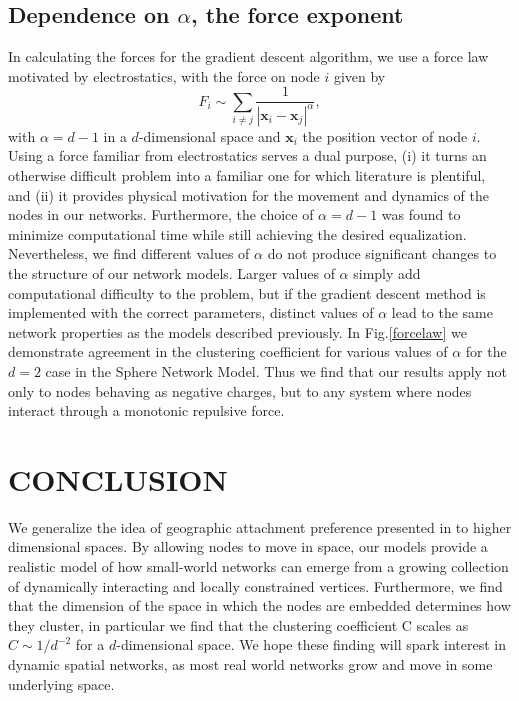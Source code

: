 \documentclass[aps,pre,manuscript,superscriptaddress,amsmath,amssymb,nofootinbib]{revtex4-1}
\begin{document}
\subsection{Dependence on $\alpha$, the force exponent}
\label{sub:forcelaw}
In calculating the forces for the gradient descent algorithm, we use a force law motivated by electrostatics, with the force on node $i$ given by 
\begin{equation}
F_i \sim \sum_{i \neq j} \frac{1}{|\textbf{x}_i - \textbf{x}_j|^{\alpha}}, 
\end{equation}
with $\alpha = d-1$ in a $d$-dimensional space and $\textbf{x}_i$ the position vector of node $i$.
Using a force familiar from electrostatics serves a dual purpose, (i) it turns an otherwise difficult problem into a familiar one for which literature is plentiful, and (ii) it provides physical motivation for the movement and dynamics of the nodes in our networks.
Furthermore, the choice of $\alpha = d-1$ was found to minimize computational time while still achieving the desired equalization.
Nevertheless, we find different values of $\alpha$ do not produce significant changes to the structure of our network models.
Larger values of $\alpha$ simply add computational difficulty to the problem, but if the gradient descent method is implemented with the correct parameters, distinct values of $\alpha$ lead to the same network properties as the models described previously.
In Fig.\ref{forcelaw} we demonstrate agreement in the clustering coefficient for various values of $\alpha$ for the $d=2$ case in the Sphere Network Model.
Thus we find that our results apply not only to nodes behaving as negative charges, but to any system where nodes interact through a monotonic repulsive force.


\section{CONCLUSION}
We generalize the idea of geographic attachment preference presented in \cite{ozik2004} to higher dimensional spaces.
By allowing nodes to move in space, our models provide a realistic model of how small-world networks can emerge from a growing collection of dynamically interacting and locally constrained vertices.  
Furthermore, we find that the dimension of the space in which the nodes are embedded determines how they cluster, in particular we find that the clustering coefficient C scales as $C \sim 1/d^{-2}$ for a $d$-dimensional space.
We hope these finding will spark interest in dynamic spatial networks, as most real world networks grow and move in some underlying space.


\end{document}
